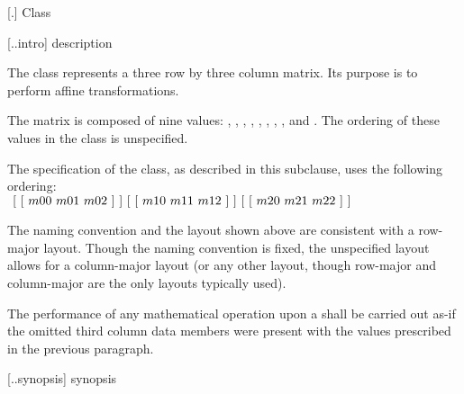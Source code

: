  [\iotwod.\matrixtwod] {Class }

 [\iotwod.\matrixtwod.intro] { description}

%
\pnum
The  class represents a three row by three column matrix. Its purpose is to perform affine transformations.

\pnum
The matrix is composed of nine  values: , , , , , , , , and . The ordering of these  values in the  class is unspecified.

\pnum
The specification of the  class, as described in this subclause, uses the following ordering: \\
$
~[~[~m00~m01~m02~]~] \\
~[~[~m10~m11~m12~]~] \\
~[~[~m20~m21~m22~]~]$

\pnum
\begin{note}
The naming convention and the layout shown above are consistent with a row-major layout. Though the naming convention is fixed, the unspecified layout allows for a column-major layout (or any other layout, though row-major and column-major are the only layouts typically used).
\end{note}

\pnum
The performance of any mathematical operation upon a  shall be carried out as-if the omitted third column data members were present with the values prescribed in the previous paragraph.

 [\iotwod.\matrixtwod.synopsis] { synopsis}

